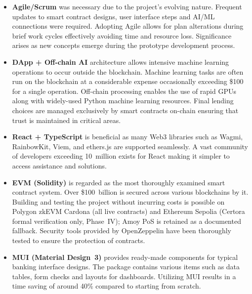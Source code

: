 \documentclass[12pt,a4paper]{report}
\begin{document}
\begin{itemize}[noitemsep]
\item \textbf{Agile/Scrum} was necessary due to the project's evolving nature. Frequent updates to smart contract designs, user interface steps and AI/ML connections were required. Adopting Agile allows for plan alterations during brief work cycles effectively avoiding time and resource loss. Significance arises as new concepts emerge during the prototype development process.

\item \textbf{DApp + Off-chain AI} architecture allows intensive machine learning operations to occur outside the blockchain. Machine learning tasks are often run on the blockchain at a considerable expense occasionally exceeding \$100 for a single operation. Off-chain processing enables the use of rapid GPUs along with widely-used Python machine learning resources. Final lending choices are managed exclusively by smart contracts on-chain ensuring that trust is maintained in critical areas.

\item \textbf{React + TypeScript} is beneficial as many Web3 libraries such as Wagmi, RainbowKit, Viem, and ethers.js are supported seamlessly. A vast community of developers exceeding 10~million exists for React making it simpler to access assistance and solutions.

\item \textbf{EVM (Solidity)} is regarded as the most thoroughly examined smart contract system. Over \$100~billion is secured across various blockchains by it. Building and testing the project without incurring costs is possible on Polygon zkEVM Cardona (all live contracts) and Ethereum Sepolia (Certora formal verification only, Phase~IV); Amoy PoS is retained as a documented fallback. Security tools provided by OpenZeppelin have been thoroughly tested to ensure the protection of contracts.

\item \textbf{MUI (Material Design~3)} provides ready-made components for typical banking interface designs. The package contains various items such as data tables, form checks and layouts for dashboards. Utilizing MUI results in a time saving of around 40\% compared to starting from scratch.


\end{itemize}
\end{document}

